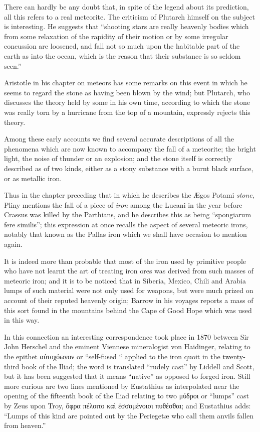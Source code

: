 \documentclass[a4paper, 11pt, oneside]{article}
\begin{document}
There can hardly be any doubt that, in spite of the legend about its prediction, all this refers to a real meteorite. The criticism of Plutarch himself on the subject is interesting. He suggests that ``shooting stars are really heavenly bodies which from some relaxation of the rapidity of their motion or by some irregular concussion are loosened, and fall not so much upon the habitable part of the earth as into the ocean, which is the reason that their substance is so seldom seen.'' 

Aristotle in his chapter on meteors has some remarks on this event in which he seems to regard the stone as having been blown by the wind; but Plutarch, who discusses the theory held by some in his own time, according to which the stone was really torn by a hurricane from the top of a mountain, expressly rejects this theory. 

Among these early accounts we find several accurate descriptions of all the phenomena which are now known to accompany the fall of a meteorite; the bright light, the noise of thunder or an explosion; and the stone itself is correctly described as of two kinds, either as a stony substance with a burnt black surface, or as metallic iron. 

Thus in the chapter preceding that in which he describes the Ægos Potami \emph{stone}, Pliny mentions the fall of a piece of \emph{iron} among the Lucani in the year before Crassus was killed by the Parthians, and he describes this as being ``spongiarum fere similis''; this expression at once recalls the aspect of several meteoric irons, notably that known as the Pallas iron which we shall have occasion to mention again. 

It is indeed more than probable that most of the iron used by primitive people who have not learnt the art of treating iron ores was derived from such masses of meteoric iron; and it is to be noticed that in Siberia, Mexico, Chili and Arabia lumps of such material were not only used for weapons, but were much prized on account of their reputed heavenly origin; Barrow in his voyages reports a mass of this sort found in the mountains behind the Cape of Good Hope which was used in this way. 

In this connection an interesting correspondence took place in 1870 between Sir John Herschel and the eminent Viennese mineralogist von Haidinger, relating to the epithet αὐτοχόωνον or ``self-fused `` applied to the iron quoit in the twenty-third book of the Iliad; the word is translated ``rudely cast'' by Liddell and Scott, but it has been suggested that it means ``native'' as opposed to forged iron. Still more curious are two lines mentioned by Eustathius as interpolated near the opening of the fifteenth book of the Iliad relating to two μύδροι or ``lumps'' cast by Zeus upon Troy, ὄφρα πέλοιτο καὶ ἐσσομένοισι πυθέσθαι; and Eustathius adds: ``Lumps of this kind are pointed out by the Periegetæ who call them anvils fallen from heaven.''
\end{document}
